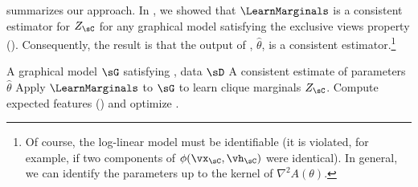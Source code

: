 
%

 summarizes our approach.
In , we showed that $\LearnMarginals$ is a consistent
estimator for $Z_\sC$ for any graphical model satisfying the exclusive views property (). 
Consequently, the result is that the output of ,
$\hat\theta$, is a consistent estimator.\footnote{Of course, the log-linear model must be identifiable
(it is violated, for example, if two components of $\phi(\vx_\sC, \vh_\sC)$ were identical).
In general, we can identify the parameters up to the kernel of $\nabla^2 A(\theta)$.}

\renewcommand{\algorithmicrequire}{\textbf{Input:}}
\renewcommand{\algorithmicensure}{\textbf{Output:}}
\begin{algorithm}
  \caption{\LearnLogLinear}
  \label{algo:undirected}
  \begin{algorithmic}
    \REQUIRE A graphical model $\sG$ satisfying , data $\sD$
    \ENSURE A consistent estimate of parameters $\hat \theta$
      \STATE Apply $\LearnMarginals$ to $\sG$ to learn clique marginals $Z_\sC$.
      \STATE Compute expected features () and optimize .
  \end{algorithmic}
\end{algorithm}

